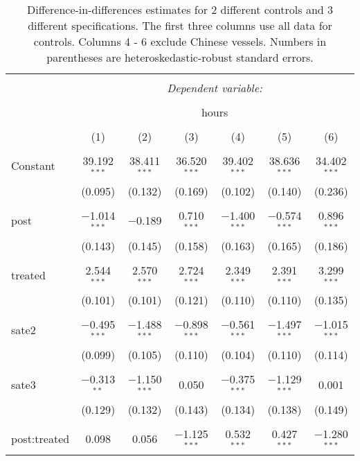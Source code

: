 \documentclass[11pt,]{article}
\begin{document}
\begin{table}[!htbp] \centering 
  \caption{\label{tab:long}Difference-in-differences estimates for 2 different controls and 3 different specifications. The first three columns use all data for controls. Columns 4 - 6 exclude Chinese vessels. Numbers in parentheses are heteroskedastic-robust standard errors.} 
  \label{} 
\small 
\begin{tabular}{@{\extracolsep{1pt}}lcccccc} 
\\[-1.8ex]\hline 
\hline \\[-1.8ex] 
 & \multicolumn{6}{c}{\textit{Dependent variable:}} \\ 
\cline{2-7} 
\\[-1.8ex] & \multicolumn{6}{c}{hours} \\ 
\\[-1.8ex] & (1) & (2) & (3) & (4) & (5) & (6)\\ 
\hline \\[-1.8ex] 
 Constant & 39.192$^{***}$ & 38.411$^{***}$ & 36.520$^{***}$ & 39.402$^{***}$ & 38.636$^{***}$ & 34.402$^{***}$ \\ 
  & (0.095) & (0.132) & (0.169) & (0.102) & (0.140) & (0.236) \\ 
  & & & & & & \\ 
 post & $-$1.014$^{***}$ & $-$0.189 & 0.710$^{***}$ & $-$1.400$^{***}$ & $-$0.574$^{***}$ & 0.896$^{***}$ \\ 
  & (0.143) & (0.145) & (0.158) & (0.163) & (0.165) & (0.186) \\ 
  & & & & & & \\ 
 treated & 2.544$^{***}$ & 2.570$^{***}$ & 2.724$^{***}$ & 2.349$^{***}$ & 2.391$^{***}$ & 3.299$^{***}$ \\ 
  & (0.101) & (0.101) & (0.121) & (0.110) & (0.110) & (0.135) \\ 
  & & & & & & \\ 
 sate2 & $-$0.495$^{***}$ & $-$1.488$^{***}$ & $-$0.898$^{***}$ & $-$0.561$^{***}$ & $-$1.497$^{***}$ & $-$1.015$^{***}$ \\ 
  & (0.099) & (0.105) & (0.110) & (0.104) & (0.110) & (0.114) \\ 
  & & & & & & \\ 
 sate3 & $-$0.313$^{**}$ & $-$1.150$^{***}$ & 0.050 & $-$0.375$^{***}$ & $-$1.129$^{***}$ & 0.001 \\ 
  & (0.129) & (0.132) & (0.143) & (0.134) & (0.138) & (0.149) \\ 
  & & & & & & \\ 
 post:treated & 0.098 & 0.056 & $-$1.125$^{***}$ & 0.532$^{***}$ & 0.427$^{***}$ & $-$1.280$^{***}$ \\ 

\end{tabular}
\end{table}
\end{document}
